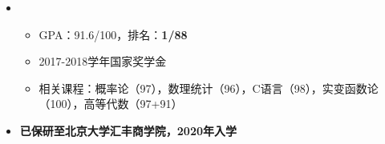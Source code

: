 	\begin{itemize}[leftmargin=*]
	\item      
      {\small
       \begin{itemize}
        \item{GPA：91.6/100，排名：\textbf{1/88}}
        \item{2017-2018学年国家奖学金}
        \item{相关课程：概率论（97），数理统计（96），C语言（98），实变函数论（100），高等代数（97+91）}
      	\end{itemize}
      }
     \item \textbf{已保研至北京大学汇丰商学院，2020年入学}
\end{itemize}
